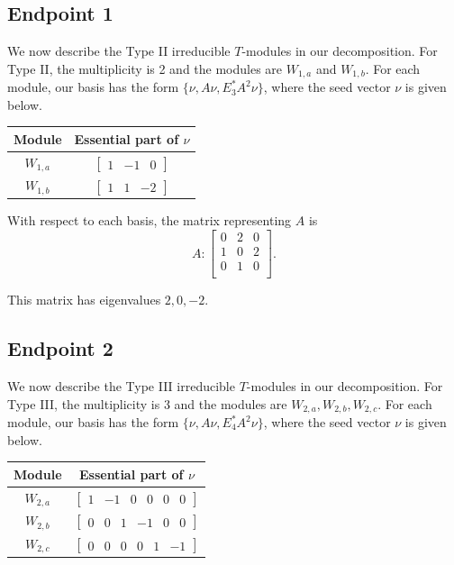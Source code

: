 \documentclass[12pt,letterpaper]{article}
\newcommand{\rowvector}[1]{\begin{bmatrix} #1 \end{bmatrix}}
\begin{document}
\subsection{Endpoint 1}

We now describe the Type II irreducible $T$-modules in our decomposition. For Type II, the multiplicity is 2 and the modules are $W_{1,a}$ and $W_{1,b}$. For each module, our basis has the form $\{\nu, A\nu, E_3^*A^2\nu\}$, where the seed vector $\nu$ is given below.
\begin{center}
    \begin{tabular}{c | c}
    \toprule
       \textbf{Module}  & \textbf {Essential part of }$\nu$ \\
       \midrule
       $W_{1,a}$  & $\rowvector{1 & -1 & 0}$ \\[1.67pt]
       $W_{1,b}$  & $\rowvector{1 & 1 & -2}$ \\
    \bottomrule
    \end{tabular}
\end{center}

With respect to each basis, the matrix representing $A$ is 
\begin{equation}
    A: \begin{bmatrix}
  0 & 2 & 0 \\
  1 & 0 & 2 \\
  0 & 1 & 0 \\
\end{bmatrix}.
\label{eq:t8-II}
\end{equation}

This matrix has eigenvalues $2, 0, -2$.

\subsection{Endpoint 2}

We now describe the Type III irreducible $T$-modules in our decomposition. For Type III, the multiplicity is 3 and the modules are $W_{2,a}, W_{2,b}, W_{2,c}$. For each module, our basis has the form $\{\nu, A\nu, E_4^*A^2\nu\}$, where the seed vector $\nu$ is given below.
\begin{center}
    \begin{tabular}{c | c}
    \toprule
       \textbf{Module}  & \textbf {Essential part of }$\nu$ \\
       \midrule
       $W_{2,a}$  & $\rowvector{1 & -1 & 0 & 0 & 0 & 0}$ \\[1.67pt]
       $W_{2,b}$  & $\rowvector{0 & 0 & 1 & -1 & 0 & 0}$ \\[1.67pt]
       $W_{2,c}$  & $\rowvector{0 & 0 & 0 & 0 & 1 & -1}$ \\
    \bottomrule
   \end{tabular}
\end{center}
\end{document}
